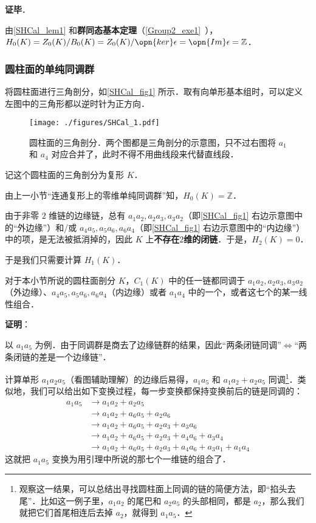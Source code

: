 \textbf{证毕}．

由\autoref{SHCal_lem1} 和\textbf{群同态基本定理}（\autoref{Group2_exe1}~），$H_0(K)=Z_0(K)/B_0(K)=Z_0(K)/\opn{ker}\epsilon=\opn{Im}\epsilon=\mathbb{Z}$．



\subsubsection{圆柱面的单纯同调群}

将圆柱面进行三角剖分，如\autoref{SHCal_fig1} 所示．取有向单形基本组时，可以定义左图中的三角形都以逆时针为正方向．

\begin{figure}[ht]
\centering
\texttt{[image: ./figures/SHCal\_1.pdf]}
\caption{圆柱面的三角剖分．两个图都是三角剖分的示意图，只不过右图将 $a_1$ 和 $a_4$ 对应合并了，此时不得不用曲线段来代替直线段．} \label{SHCal_fig1}
\end{figure}

记这个圆柱面的三角剖分为复形 $K$．

由上一小节“连通复形上的零维单纯同调群”知，$H_0(K)=\mathbb{Z}$．

由于非零 $2$ 维链的边缘链，总有 $a_1a_2, a_2a_3, a_3a_2$（即\autoref{SHCal_fig1} 右边示意图中的“外边缘”）和/或 $a_4a_5, a_5a_6, a_6a_4$（即\autoref{SHCal_fig1} 右边示意图中的“内边缘”）中的项，是无法被抵消掉的，因此 $K$ 上\textbf{不存在}$2$\textbf{维的闭链}．于是，$H_2(K)=0$．

于是我们只需要计算 $H_1(K)$．

\begin{lemma}{}\label{SHCal_lem2}
对于本小节所说的圆柱面剖分 $K$，$C_1(K)$ 中的任一链都同调于 $a_1a_2, a_2a_3, a_3a_2$（外边缘）、$a_4a_5, a_5a_6, a_6a_4$（内边缘）或者 $a_1a_4$ 中的一个，或者这七个的某一线性组合．
\end{lemma}

\textbf{证明}：

以 $a_1a_5$ 为例．由于同调群是商去了边缘链群的结果，因此“两条闭链同调”$\iff$“两条闭链的差是一个边缘链”．

计算单形 $a_1a_2a_5$（看图辅助理解）的边缘后易得，$a_1a_5$ 和 $a_1a_2+a_2a_5$ 同调\footnote{观察这一结果，可以总结出寻找圆柱面上同调的链的简便方法，即“掐头去尾”．比如这一例子里，$a_1a_2$ 的尾巴和 $a_2a_5$ 的头部相同，都是 $a_2$，那么我们就把它们首尾相连后去掉 $a_2$，就得到 $a_1a_5$．}．类似地，我们可以给出如下变换过程，每一步变换都保持变换前后的链是同调的：
\begin{equation}\label{SHCal_eq1}
\begin{aligned}
a_1a_5&\to a_1a_2+a_2a_5\\
&\to a_1a_2+a_6a_5+a_2a_6\\
&\to a_1a_2+a_6a_5+a_2a_3+a_3a_6\\&
\to a_1a_2+a_6a_5+a_2a_3+a_4a_6+a_3a_4\\
&\to a_1a_2+a_6a_5+a_2a_3+a_4a_6+a_3a_1+a_1a_4
\end{aligned}
\end{equation}
这就把 $a_1a_5$ 变换为用引理中所说的那七个一维链的组合了．

